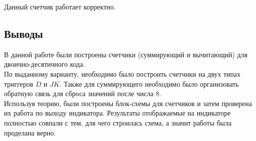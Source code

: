 \documentclass[12pt]{article}
\begin{document}
Данный счетчик работает корректно.

\subsection*{Выводы}
В данной работе были построены счетчики (суммирующий и вычитающий) для двоично-десятичного кода. \\
По выданному варианту, необходимо было построить счетчики на двух типах триггеров $D$ и $JK$. Также для суммирующего необходимо было организовать обратную связь для сброса значений после числа $8$. \\
Используя теорию, были построены блок-схемы для счетчиков и затем проверена их работа по выходу индикатора. Результаты отображаемые на индикаторе полностью совпали с тем, для чего строилась схема, а значит работы была проделана верно.
\end{document}
